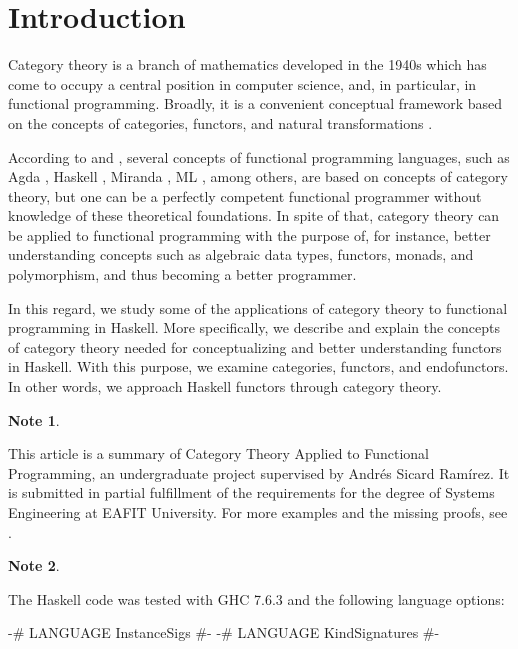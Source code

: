 \documentclass[11pt,letterpaper]{article}
\theoremstyle{definition}
\newtheorem{note}{Note}[section]
\begin{document}

\section{Introduction}
\label{sec:introduction}

Category theory is a branch of mathematics developed in the 1940s
which has come to occupy a central position in computer science, and,
in particular, in functional programming. Broadly, it is a convenient
conceptual framework based on the concepts of categories, functors,
and natural transformations
\parencites[vii]{maclane-1998}[1]{marquis-2013}.

According to \textcite[73]{elkins-2009} and
\textcite[50--51]{yorgey-2009}, several concepts of functional
programming languages, such as Agda \parencites{norell-2007}{agda},
Haskell \parencite{peytonjones-2003}, Miranda \parencite{turner-1985},
ML \parencite{milner-1984}, among others, are based on concepts of
category theory, but one can be a perfectly competent functional
programmer without knowledge of these theoretical foundations. In
spite of that, category theory can be applied to functional
programming with the purpose of, for instance, better understanding
concepts such as algebraic data types, functors, monads, and
polymorphism, and thus becoming a better programmer.

In this regard, we study some of the applications of category theory
to functional programming in Haskell. More specifically, we describe
and explain the concepts of category theory needed for conceptualizing
and better understanding functors in Haskell. With this purpose, we
examine categories, functors, and endofunctors. In other words, we
approach Haskell functors through category theory.

\begin{note}
  \label{note:cain}

  This article is a summary of Category Theory Applied to Functional
  Programming, an undergraduate project supervised by Andrés Sicard
  Ramírez. It is submitted in partial fulfillment of the requirements
  for the degree of Systems Engineering at EAFIT University. For more
  examples and the missing proofs, see \parencite[§§~2,
    4]{villaisaza-2014}.

\end{note}

\begin{note}
  \label{note:haskell}

  The Haskell code was tested with GHC 7.6.3 and the following
  language options:
  \begin{code}
{-# LANGUAGE InstanceSigs   #-}
{-# LANGUAGE KindSignatures #-}
  \end{code}

\end{note}
\end{document}

